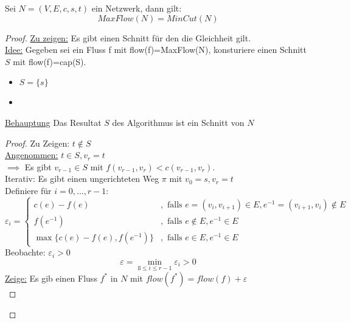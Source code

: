 \begin{theorem}
\label{thm:min-cut}
Sei $N=(V,E,c,s,t)$ ein Netzwerk, dann gilt:
\[
MaxFlow(N)=MinCut(N)
\]
\end{theorem}
\begin{proof}
\underline{Zu zeigen:} Es gibt einen Schnitt für den die Gleichheit gilt. \\
\underline{Idee:} Gegeben sei ein Fluss f mit flow(f)=MaxFlow(N), konsturiere einen Schnitt $S$ mit flow(f)=cap(S). \\
\begin{algorithm}[H]
\label{alg:beweis-max-min}
\begin{itemize}
	\item $S=\{s\}$ 
	\item {}
\end{itemize}
\end{algorithm}
\underline{Behauptung} Das Resultat $S$ des Algorithmus ist ein Schnitt von $N$
\begin{proof}
Zu Zeigen: $t \not\in S$ \\
\underline{Angenommen:}  $t \in S, v_r=t$ \\
$\implies$ Es gibt $v_{r-1} \in S$ mit $f(v_{r-1},v_r) < c(v_{r-1},v_r)$. \\
Iterativ: Es gibt einen ungerichteten Weg $\pi$ mit $v_0=s, v_r=t$\\
Definiere für $i=0,\ldots,r-1$:
\[
\varepsilon_i = \begin{cases}
	c(e)-f(e) &, \text{ falls } e=(v_i,v_{i+1}) \in E , e^{-1}=(v_{i+1}, v_i) \not\in E \\
	f(e^{-1}) &, \text{ falls } e \not\in E , e^{-1} \in E \\
	\max \{c(e)-f(e), f(e^{-1})\} &, \text{ falls } e \in E , e^{-1} \in E
\end{cases}
\]
Beobachte: $\varepsilon_i > 0$
\begin{equation}
	\label{eqn:epsilon}
\varepsilon = \min_{ß\le i \le r-1} \varepsilon_i > 0
\end{equation}
\underline{Zeige:} Es gib einen Fluss $f^{*}$ in $N$  mit $flow(f^{*}) = flow(f)+\varepsilon$ \\

\end{proof}
\end{proof}
